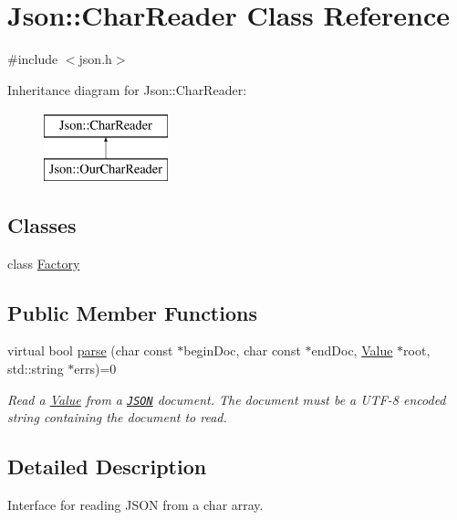 \hypertarget{class_json_1_1_char_reader}{}\section{Json\+:\+:Char\+Reader Class Reference}
\label{class_json_1_1_char_reader}


{\ttfamily \#include $<$json.\+h$>$}

Inheritance diagram for Json\+:\+:Char\+Reader\+:\begin{figure}[H]
\begin{center}
\leavevmode
\includegraphics[height=2.000000cm]{class_json_1_1_char_reader}
\end{center}
\end{figure}
\subsection*{Classes}
\begin{DoxyCompactItemize}
\item 
class \hyperlink{class_json_1_1_char_reader_1_1_factory}{Factory}
\end{DoxyCompactItemize}
\subsection*{Public Member Functions}
\begin{DoxyCompactItemize}
\item 
virtual bool \hyperlink{class_json_1_1_char_reader_a48e320be8b13bbc0960cc5808cafec98}{parse} (char const $\ast$begin\+Doc, char const $\ast$end\+Doc, \hyperlink{class_json_1_1_value}{Value} $\ast$root, std\+::string $\ast$errs)=0
\begin{DoxyCompactList}\small\item\em Read a \hyperlink{class_json_1_1_value}{Value} from a \href{http://www.json.org}{\tt J\+S\+ON} document. The document must be a U\+T\+F-\/8 encoded string containing the document to read. \end{DoxyCompactList}\end{DoxyCompactItemize}


\subsection{Detailed Description}
Interface for reading J\+S\+ON from a char array. 

